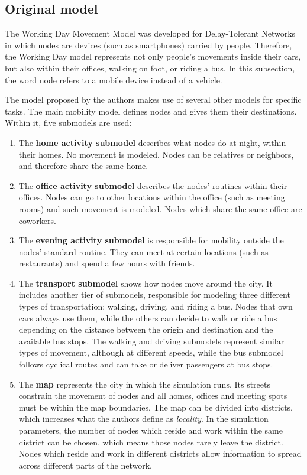 \subsection{Original model}
The Working Day Movement Model was developed for Delay-Tolerant Networks in which nodes are devices (such as smartphones) carried by people.
Therefore, the Working Day model represents not only people's movements inside their cars, but also within their offices, walking on foot, or riding a bus.
In this subsection, the word node refers to a mobile device instead of a vehicle.

The model proposed by the authors makes use of several other models for specific tasks.
The main mobility model defines nodes and gives them their destinations.
Within it, five submodels are used:
\begin{enumerate}
\item 
The \textbf{home activity submodel} describes what nodes do at night, within their homes.
No movement is modeled.
Nodes can be relatives or neighbors, and therefore share the same home.
\item 
The \textbf{office activity submodel} describes the nodes' routines within their offices.
Nodes can go to other locations within the office (such as meeting rooms) and such movement is modeled.
Nodes which share the same office are coworkers.
\item 
The \textbf{evening activity submodel} is responsible for mobility outside the nodes' standard routine. 
They can meet at certain locations (such as restaurants) and spend a few hours with friends.
\item
The \textbf{transport submodel} shows how nodes move around the city.
It includes another tier of submodels, responsible for modeling three different types of transportation: walking, driving, and riding a bus.
Nodes that own cars always use them, while the others can decide to walk or ride a bus depending on the distance between the origin and destination and the available bus stops.
The walking and driving submodels represent similar types of movement, although at different speeds, while the bus submodel follows cyclical routes and can take or deliver passengers at bus stops.
\item
The \textbf{map} represents the city in which the simulation runs.
Its streets constrain the movement of nodes and all homes, offices and meeting spots must be within the map boundaries.
The map can be divided into districts, which increases what the authors define as \textit{locality}.
In the simulation parameters, the number of nodes which reside and work within the same district can be chosen, which means those nodes rarely leave the district.
Nodes which reside and work in different districts allow information to spread across different parts of the network.
\end{enumerate}

